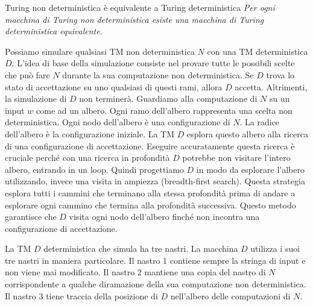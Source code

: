 \begin{Thm}{Turing non deterministica è equivalente a Turing deterministica}{}
\textit{Per ogni macchina di Turing non deterministica esiste una macchina di Turing deterministica equivalente.}

\begin{osservation}
Possiamo simulare qualsiasi TM non deterministica $N$ con una TM deterministica $D$. L'idea di base della simulazione consiste nel provare tutte le possibili scelte che può fare $N$ durante la sua computazione non deterministica. Se $D$ trova lo stato di accettazione su uno qualsiasi di questi rami, allora $D$ accetta. Altrimenti, la simulazione di $D$ non terminerà. Guardiamo alla computazione di $N$ su un input $w$ come ad un albero. Ogni ramo dell'albero rappresenta una scelta non deterministica. Ogni nodo dell'albero è una configurazione di $N$. La radice dell'albero è la configurazione iniziale. La TM $D$ esplora questo albero alla ricerca di una configurazione di accettazione. Eseguire accuratamente questa ricerca è cruciale perché con una ricerca in profondità $D$ potrebbe non visitare l'intero albero, entrando in un loop. Quindi progettiamo $D$ in modo da esplorare l'albero utilizzando, invece una visita in ampiezza (breadth-first search). Questa strategia esplora tutti i cammini che terminano alla stessa profondità prima di andare a esplorare ogni cammino che termina alla profondità successiva. Questo metodo garantisce che $D$ visita ogni nodo dell'albero finché non incontra una configurazione di accettazione.
\end{osservation}

\begin{demonstration}
La TM $D$ deterministica che simula ha tre nastri. La macchina $D$ utilizza i suoi tre nastri in maniera particolare. Il nastro 1 contiene sempre la stringa di input e non viene mai modificato. Il nastro 2 mantiene una copia del nastro di $N$ corrispondente a qualche diramazione della sua computazione non deterministica. Il nastro 3 tiene traccia della posizione di $D$ nell'albero delle computazioni di $N$.


\end{demonstration}
\end{Thm}
